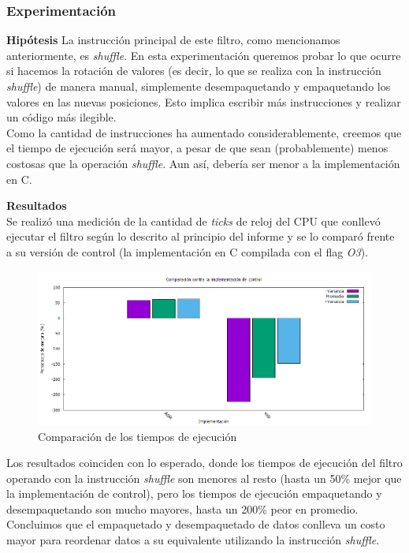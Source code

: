 \documentclass[a4paper]{article}
\begin{document}
\subsubsection{Experimentación}
\textbf{Hipótesis}
\newline
La instrucción principal de este filtro, como mencionamos anteriormente, es \textit{shuffle}. En esta experimentación queremos probar lo que ocurre si hacemos la rotación de valores (es decir, lo que se realiza con la instrucción \textit{shuffle}) de manera manual, simplemente desempaquetando y empaquetando los valores en las nuevas posiciones. Esto implica escribir más instrucciones y realizar un código más ilegible.
\\Como la cantidad de instrucciones ha aumentado considerablemente, creemos que el tiempo de ejecución será mayor, a pesar de que sean (probablemente) menos costosas que la operación \textit{shuffle}. Aun así, debería ser menor a la implementación en C. 
\newline

\textbf{Resultados}
\\Se realizó una medición de la cantidad de \textit{ticks} de reloj del CPU que conllevó ejecutar el filtro según lo descrito al principio del informe y se lo comparó frente a su versión de control (la implementación en C compilada con el flag \textit{O3}).

\begin{figure}[H]
  \begin{center}
	\includegraphics[scale=0.66]{imagenes/rotarExp.png}
	\caption{Comparación de los tiempos de ejecución}
	\label{rotar_exp}
  \end{center}
\end{figure}

Los resultados coinciden con lo esperado, donde los tiempos de ejecución del filtro operando con la instrucción \textit{shuffle} son menores al resto (hasta un 50\% mejor que la implementación de control), pero los tiempos de ejecución empaquetando y desempaquetando son mucho mayores, hasta un 200\% peor en promedio. Concluimos que el empaquetado y desempaquetado de datos conlleva un costo mayor para reordenar datos a su equivalente utilizando la instrucción \textit{shuffle}.
\end{document}
